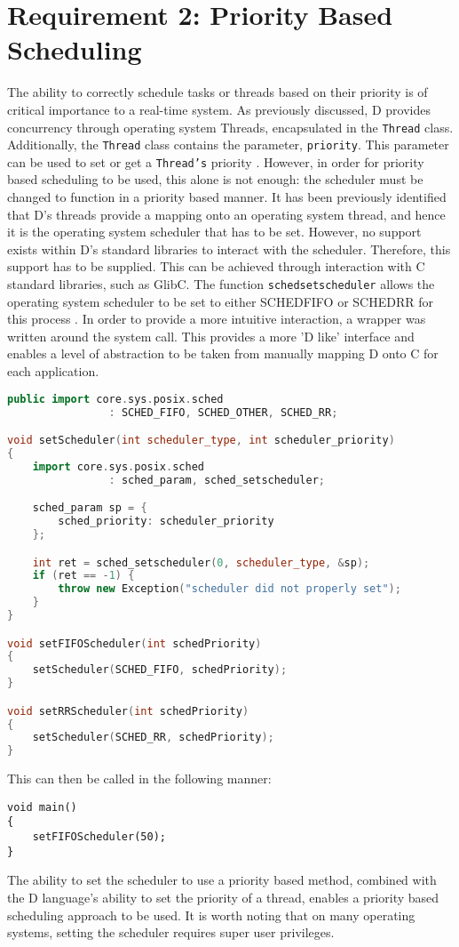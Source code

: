 \section{Requirement 2: Priority Based Scheduling}
The ability to correctly schedule tasks or threads based on their priority is of 
critical importance to a real-time system. As previously discussed, D provides 
concurrency through operating system Threads, encapsulated in the
\texttt{Thread} class. Additionally, the \texttt{Thread} class contains the 
parameter, \texttt{priority}. This parameter can be used to set or get a
\texttt{Thread's} priority \cite{core-thread}. 
However, in order for priority based scheduling to be used, this alone is not 
enough: the scheduler must be changed to function in a priority based manner. 
It has been previously identified that D's threads provide a mapping onto an operating  
system thread, and hence it is the operating system scheduler that has to be set.  
However, no support exists within D's standard libraries to interact with the
scheduler. 
Therefore, this support has to be supplied. 
This can be achieved through interaction with C standard libraries, such as GlibC. 
The function \texttt{sched\textunderscore{}setscheduler} allows the operating system 
scheduler to be set to either SCHED\textunderscore{}FIFO or SCHED\textunderscore{}RR for 
this process \cite{sched-setscheduler}. 
In order to provide a more intuitive interaction, a wrapper was written around the 
system call. This provides a more 'D like' interface and enables a level of
abstraction to be taken from manually mapping D onto C for each application. 
\begin{lstlisting}[basicstyle=\small,language=C++]
public import core.sys.posix.sched 
                : SCHED_FIFO, SCHED_OTHER, SCHED_RR; 

void setScheduler(int scheduler_type, int scheduler_priority)
{
    import core.sys.posix.sched 
                : sched_param, sched_setscheduler; 

    sched_param sp = { 
        sched_priority: scheduler_priority 
    }; 

    int ret = sched_setscheduler(0, scheduler_type, &sp); 
    if (ret == -1) {
        throw new Exception("scheduler did not properly set");
    }
}

void setFIFOScheduler(int schedPriority)
{
    setScheduler(SCHED_FIFO, schedPriority);
}

void setRRScheduler(int schedPriority)
{
    setScheduler(SCHED_RR, schedPriority); 
}
\end{lstlisting}
This can then be called in the following manner: 
\begin{lstlisting}[basicstyle=\small]
void main()
{
    setFIFOScheduler(50); 
}
\end{lstlisting}
The ability to set the scheduler to use a priority based method, combined with 
the D language's ability to set the priority of a thread, 
enables a priority based scheduling approach to be used. It is worth noting
that on many operating systems, setting the scheduler requires super user
privileges. 

